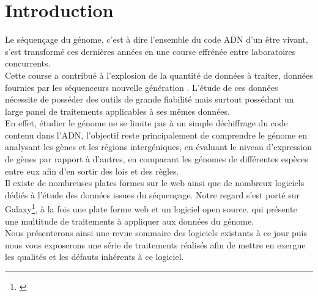 \chapter*{Introduction}

Le séquençage du génome, c'est à dire l'ensemble du code ADN d'un être vivant, s'est transformé ces dernières années en une course effrénée entre laboratoires concurrents.\\

Cette course a contribué à l'explosion de la quantité de données à traiter, données fournies par les séquenceurs nouvelle génération . L'étude de ces données nécessite de posséder des outils de grande fiabilité mais surtout possédant un large panel de traitements applicables à ses mêmes données.\\

 En effet, étudier le génome ne se limite pas à un simple déchiffrage du code contenu dans l'ADN, l'objectif reste principalement de comprendre le génome en analysant les gènes et les régions intergéniques, en évaluant le niveau d'expression de gènes par rapport à d'autres, en comparant les génomes de différentes espèces entre eux afin d'en sortir des lois et des règles.\\
 
 Il existe de nombreuses plates formes sur le web ainsi que de nombreux logiciels dédiés à l'étude des données issues du séquençage. Notre regard s'est porté sur Galaxy\footnote{\cite{afgan2010galaxy}\cite{afgan2011harnessing}\cite{afganreference}\cite{afgan2011galaxy}\cite{blankenberg2011integrating}\cite{blankenberg2010manipulation}\cite{blankenberg2011making}\cite{blankenberg2007framework}\cite{bock2010web}\cite{giardine2005galaxy}\cite{goecks2011galaxy}\cite{lazarus2008toward}\cite{miller200728}\cite{pond2009windshield}\cite{schatz2010missing}}, à la fois une plate forme web et un logiciel open source, qui présente une multitude de traitements à appliquer aux données du génome.\\
 
 Nous présenterons ainsi une revue sommaire des logiciels existants à ce jour puis nous vous exposerons une série de traitements réalisés afin de mettre en exergue les qualités et les défauts inhérents à ce logiciel.
